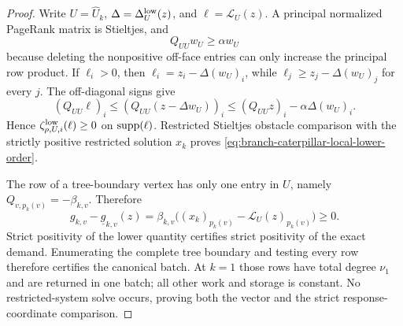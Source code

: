 \begin{proof}
Write $U=\widehat U_k$, $\Delta=\Delta_U^{\rm low}(z)$, and
$\ell=\mathcal L_U(z)$.  A principal normalized PageRank matrix is Stieltjes,
and
\begin{equation*}
 Q_{UU}w_U\geq\alpha w_U
\end{equation*}
because deleting the nonpositive off-face entries can only increase the
principal row product.  If $\ell_i>0$, then
$\ell_i=z_i-\Delta(w_U)_i$, while
$\ell_j\geq z_j-\Delta(w_U)_j$ for every $j$.  The off-diagonal signs give
\begin{equation*}
 (Q_{UU}\ell)_i
 \leq(Q_{UU}(z-\Delta w_U))_i
 \leq(Q_{UU}z)_i-\alpha\Delta(w_U)_i.
\end{equation*}
Hence
$\zeta_{\rho,U,i}^{\rm low}(\ell)\geq0$ on $\operatorname{supp}(\ell)$.
Restricted Stieltjes obstacle comparison with the strictly positive
restricted solution $x_k$ proves
\cref{eq:branch-caterpillar-local-lower-order}.

The row of a tree-boundary vertex has only one entry in $U$, namely
$Q_{v,p_k(v)}=-\beta_{k,v}$.  Therefore
\begin{equation}
 g_{k,v}-\underline g_{k,v}(z)
 =\beta_{k,v}
   \bigl((x_k)_{p_k(v)}-
    \mathcal L_U(z)_{p_k(v)}\bigr)\geq0.
 \label{eq:branch-caterpillar-local-lower-demand-order}
\end{equation}
Strict positivity of the lower quantity certifies strict positivity of the
exact demand.  Enumerating the complete tree boundary and testing every row
therefore certifies the canonical batch.  At $k=1$ those rows have total
degree $\nu_1$ and are returned in one batch; all other work and storage is
constant.  No restricted-system solve occurs, proving both the vector and
the strict response-coordinate comparison.
\end{proof}

